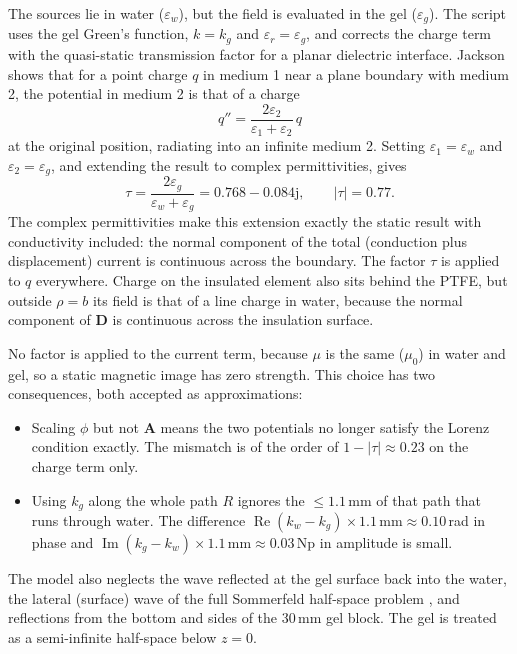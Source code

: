 \documentclass[11pt,a4paper]{article}
\newcommand{\eps}{\varepsilon}
\newcommand{\jj}{\mathrm{j}}
\begin{document}
The sources lie in water ($\eps_w$), but the field is evaluated in the gel ($\eps_g$). The script uses the
gel Green's function, $k=k_g$ and $\eps_r=\eps_g$, and corrects the charge term with the quasi-static
transmission factor for a planar dielectric interface. Jackson \cite[\S4.4]{Jackson1999} shows that for a
point charge $q$ in medium 1 near a plane boundary with medium 2, the potential in medium 2 is that of a
charge
\begin{equation}
  q'' = \frac{2\eps_2}{\eps_1+\eps_2}\,q
\end{equation}
at the original position, radiating into an infinite medium 2. Setting $\eps_1=\eps_w$ and $\eps_2=\eps_g$,
and extending the result to complex permittivities, gives
\begin{equation}
  \tau = \frac{2\eps_g}{\eps_w+\eps_g} = 0.768 - 0.084\jj, \qquad |\tau| = 0.77 .
  \label{eq:tau}
\end{equation}
The complex permittivities make this extension exactly the static result with conductivity included: the
normal component of the total (conduction plus displacement) current is continuous across the boundary.
The factor $\tau$ is applied to $q$ everywhere. Charge on the insulated element also sits behind the PTFE,
but outside $\rho=b$ its field is that of a line charge in water, because the normal component of
$\mathbf D$ is continuous across the insulation surface.

No factor is applied to the current term, because $\mu$ is the same ($\mu_0$) in water and gel, so a
static magnetic image has zero strength. This choice has two consequences, both accepted as approximations:
\begin{itemize}
  \item Scaling $\phi$ but not $\mathbf A$ means the two potentials no longer satisfy the Lorenz condition
        exactly. The mismatch is of the order of $1-|\tau|\approx0.23$ on the charge term only.
  \item Using $k_g$ along the whole path $R$ ignores the $\le1.1$\,mm of that path that runs through water.
        The difference $\operatorname{Re}(k_w-k_g)\times1.1\,\text{mm}\approx0.10$\,rad in phase and
        $\operatorname{Im}(k_g-k_w)\times1.1\,\text{mm}\approx0.03$\,Np in amplitude is small.
\end{itemize}
The model also neglects the wave reflected at the gel surface back into the water, the lateral (surface)
wave of the full Sommerfeld half-space problem \cite{KingOwensWu1992}, and reflections from the bottom and
sides of the 30\,mm gel block. The gel is treated as a semi-infinite half-space below $z=0$.
\end{document}
